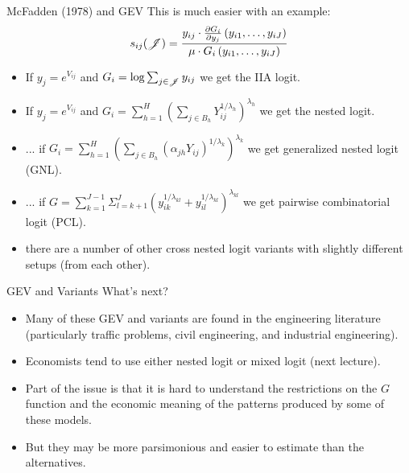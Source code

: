 \documentclass[aspectratio=169,11pt]{beamer}
\begin{document}
\begin{frame}{McFadden (1978) and GEV}
This is much easier with an example:
\begin{align*}
s_{ij}(\mathscr{J})=\frac{y_{ij}\cdot  \frac{\partial G_i}{\partial y_{j}}\left(y_{i1}, \ldots, y_{iJ}\right)}{\mu \cdot G_i\left(y_{i1}, \ldots, y_{iJ}\right)}
\end{align*}
\begin{itemize}
\item If $y_j = e^{V_{ij}}$ and $G_i = \log \sum_{j \in \mathscr{J}} y_{ij} $ we get the IIA logit.
\item If $y_j = e^{V_{ij}}$ and $G_i=\sum_{h=1}^{H}\left(\sum_{j \in B_{h}} Y_{ij}^{1 / \lambda_{h}}\right)^{\lambda_{h}}$ we get the nested logit.
\item ... if $G_i=\sum_{h=1}^{H}\left(\sum_{j \in B_{h}}\left(\alpha_{j h} Y_{ij}\right)^{1 / \lambda_{k}}\right)^{\lambda_{k}}$ we get \alert{generalized nested logit} (GNL).
\item ... if $G=\sum_{k=1}^{J-1} \Sigma_{l=k+1}^{J}\left(y_{i k}^{1 / \lambda_{k l}}+y_{i l}^{1 / \lambda_{k l}}\right)^{\lambda_{k l}}$ we get \alert{pairwise combinatorial logit} (PCL).
\item there are a number of other \alert{cross nested logit} variants with slightly different setups (from each other).
\end{itemize}
\end{frame}



\begin{frame}{GEV and Variants}
What's next?
\begin{itemize}
\item Many of these GEV and variants are found in the engineering literature (particularly traffic problems, civil engineering, and industrial engineering).
\item Economists tend to use either nested logit or mixed logit (next lecture).
\item Part of the issue is that it is hard to understand the restrictions on the $G$ function and the economic meaning of the patterns produced by some of these models.
\item But they may be more parsimonious and easier to estimate than the alternatives.
\end{itemize}
\end{frame}
\end{document}
